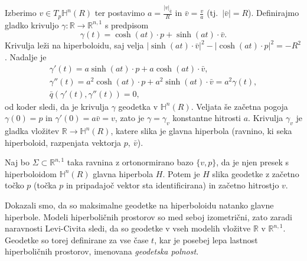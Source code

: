 \documentclass[a4paper]{article}
\begin{document}
Izberimo $v \in T_{p}\mathbb{H}^{n}(R)$ ter postavimo $a=\frac{|v|_{\bar{q}}}{R}$ in $\bar{v}=\frac{v}{a}$ (tj.~$|\bar{v}|=R$).
Definirajmo gladko krivuljo $\gamma \colon \mathbb{R} \to \mathbb{R}^{n,1}$ s predpisom
\[ \gamma(t) = \cosh(at) \cdot p + \sinh(at) \cdot \bar{v}. \]
Krivulja leži na hiperboloidu, saj velja $ |\sinh(at) \cdot \bar{v}|^2 - |\cosh(at) \cdot p|^2 = -R^2$. Nadalje je 
\begin{gather*}
\gamma'(t) = a\sinh(at) \cdot p + a\cosh(at) \cdot \bar{v}, \\
\gamma''(t) = a^2\cosh(at) \cdot p + a^2\sinh(at) \cdot \bar{v} = a^2 \gamma(t), \\
\bar{q}(\gamma'(t), \gamma''(t)) = 0,
\end{gather*}
od koder sledi, da je krivulja $\gamma$ geodetka v $\mathbb{H}^{n}(R)$.
Veljata še začetna pogoja $\gamma(0)=p$ in $\gamma'(0)=a\bar{v}=v$, zato je $\gamma = \gamma_{v}$ konstantne hitrosti $a$.
Krivulja $\gamma_{v}$ je gladka vložitev $\mathbb{R} \to \mathbb{H}^{n}(R)$, katere slika je glavna hiperbola (ravnino, ki seka hiperboloid, razpenjata vektorja $p, \ \bar{v}$).

Naj bo $\Sigma \subset \mathbb{R}^{n,1}$ taka ravnina z ortonormirano bazo $\{v,p\}$, da je njen presek s hiperboloidom $\mathbb{H}^{n}(R)$ glavna hiperbola $H$. Potem je $H$ slika geodetke z začetno točko $p$ (točka $p$ in pripadajoč vektor sta identificirana) in začetno hitrostjo $v$.\newline

Dokazali smo, da so maksimalne geodetke na hiperboloidu natanko glavne hiperbole. Modeli hiperboličnih prostorov so med seboj izometrični, zato zaradi naravnosti Levi-Civita sledi, da so geodetke v vseh modelih vložitve $\mathbb{R}$ v $\mathbb{R}^{n,1}$. Geodetke so torej definirane za vse čase $t$, kar je posebej lepa lastnost hiperboličnih prostorov, imenovana \emph{geodetska polnost}.\newline
\end{document}
